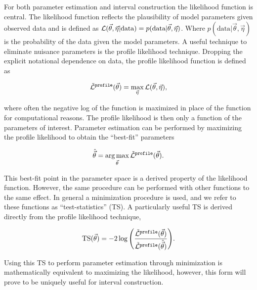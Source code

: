 For both parameter estimation and interval construction the likelihood function is central.
The likelihood function reflects the plausibility of model parameters given observed data and is defined as $\mathcal{L}(\vec\theta, \vec\eta|\textrm{data}) = p(\textrm{data}|\vec\theta, \vec\eta)$.
Where $p(\textrm{data}|\vec\theta, \vec\eta)$ is the probability of the data given the model parameters.
A useful technique to eliminate nuisance parameters is the profile likelihood technique.
Dropping the explicit notational dependence on data, the profile likelihood function is defined as
\begin{linenomath*}
	\begin{equation}
	\tilde{\mathcal{L}}^\texttt{profile}(\vec\theta) = \max_{\vec\eta} \mathcal{L}(\vec\theta,\vec\eta),
	\label{eq:likelihood_profile}
	\end{equation}
\end{linenomath*}
where often the negative log of the function is maximized in place of the function for computational reasons.
The profile likelihood is then only a function of the parameters of interest.
Parameter estimation can be performed by maximizing the profile likelihood to obtain the ``best-fit'' parameters
\begin{linenomath*}
	\begin{equation}
	\hat{\vec\theta} = \operatorname*{arg\,max}_{\vec\theta} \tilde{\mathcal{L}}^\texttt{profile}(\vec\theta).
	\label{eq:best_fit}
	\end{equation}
\end{linenomath*}
This best-fit point in the parameter space is a derived property of the likelihood function.
However, the same procedure can be performed with other functions to the same effect.
In general a minimization procedure is used, and we refer to these functions as ``test-statistics'' (TS).
A particularly useful TS is derived directly from the profile likelihood technique,
\begin{linenomath*}
	\begin{equation}
	\mathrm{TS}(\vec\theta) = -2\log{\left(\frac{\tilde{\mathcal{L}}^\texttt{profile}(\vec\theta)}{\tilde{\mathcal{L}}^\texttt{profile}(\hat{\vec\theta})}\right)}.
	\end{equation}
\end{linenomath*}
Using this TS to perform parameter estimation through minimization is mathematically equivalent to maximizing the likelihood, however, this form will prove to be uniquely useful for interval construction.

